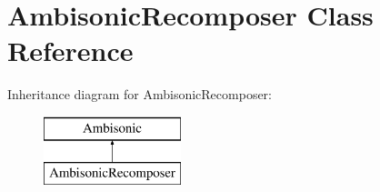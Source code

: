 \hypertarget{class_ambisonic_recomposer}{\section{Ambisonic\-Recomposer Class Reference}
\label{class_ambisonic_recomposer}
}
Inheritance diagram for Ambisonic\-Recomposer\-:\begin{figure}[H]
\begin{center}
\leavevmode
\includegraphics[height=2.000000cm]{class_ambisonic_recomposer}
\end{center}
\end{figure}
